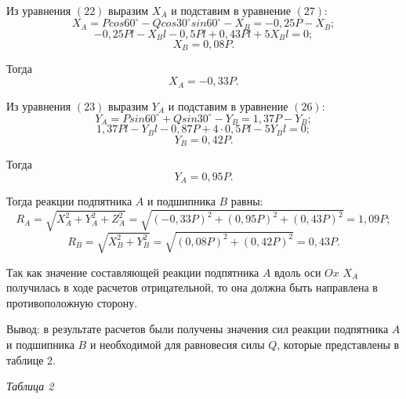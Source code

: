 \documentclass{article}
\begin{document}
Из уравнения $(22)$ выразим $X_A$ и подставим в уравнение $(27)$:
\begin{equation}
X_A = Pcos60^\circ - Qcos30^\circ sin60^\circ - X_B = -0,25P - X_B;
\end{equation}
\begin{equation}
-0,25Pl - X_Bl -0,5Pl +0,43Pl +5X_Bl = 0;
\end{equation}
\begin{equation}
X_B = 0,08P.
\end{equation}

Тогда
\begin{equation}
X_A = -0,33P.
\end{equation}

Из уравнения $(23)$ выразим $Y_A$ и подставим в уравнение $(26)$:
\begin{equation}
Y_A = Psin60^\circ + Qsin30^\circ - Y_B = 1,37P - Y_B;
\end{equation}
\begin{equation}
1,37Pl - Y_Bl - 0,87P +4\cdot0,5Pl -5Y_Bl = 0;
\end{equation}
\begin{equation}
Y_B = 0,42P.
\end{equation}

Тогда
\begin{equation}
Y_A = 0,95P.
\end{equation}

Тогда реакции подпятника $A$ и подшипника $B$ равны:
\begin{equation}
R_A = \sqrt{X^2_A + Y^2_A + Z^2_A} = \sqrt{(-0,33P)^2 + (0,95P)^2 + (0,43P)^2} = 1,09P;
\end{equation}
\begin{equation}
R_{B} = \sqrt{X^2_B + Y^2_B} = \sqrt{(0,08P)^2 + (0,42P)^2} = 0,43P.
\end{equation}

Так как значение составляющей реакции подпятника $A$ вдоль оси $Ox$ $X_A$ получилась в ходе расчетов отрицательной, то она должна быть направлена в противоположную сторону.

Вывод: в результате расчетов были получены значения сил реакции подпятника $A$ и подшипника $B$ и необходимой для равновесия силы $Q$, которые представлены в таблице 2.

\newpage

\begin{flushright}
  \textit{Таблица 2} \hspace*{0.4cm}
\end{flushright}
\end{document}

